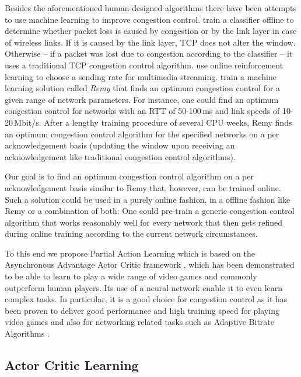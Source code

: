 \documentclass[newfonts=false,format=sigconf,10pt,letterpaper]{acmart}
\begin{document}
Besides the aforementioned human-designed algorithms there have been attempts to use machine learning to improve congestion control. \citet{geurts_machine_2004} train a classifier offline to determine whether packet loss is caused by congestion or by the link layer in case of wireless links. If it is caused by the link layer, TCP does not alter the window. Otherwise -- if a packet was lost due to congestion according to the classifier -- it uses a traditional TCP congestion control algorithm. \citet{shaio_reinforcement_2005} use online reinforcement learning to choose a sending rate for multimedia streaming. \citet{winstein_tcp_2013} train a machine learning solution called \textit{Remy} that finds an optimum congestion control for a given range of network parameters. For instance, one could find an optimum congestion control for networks with an RTT of 50-100\,ms and link speeds of 10-20\,Mbit/s. After a lengthy training procedure of several CPU weeks, Remy finds an optimum congestion control algorithm for the specified networks on a per acknowledgement basis (updating the window upon receiving an acknowledgement like traditional congestion control algorithms). 

Our goal is to find an optimum congestion control algorithm on a per acknowledgement basis similar to Remy that, however, can be trained online.  Such a solution could be used in a purely online fashion, in a offline fashion like Remy or a combination of both: One could pre-train a generic congestion control algorithm that works reasonably well for every network that then gets refined during online training according to the current network circumstances. 

To this end we propose Partial Action Learning which is based on the Asynchronous Advantage Actor Critic framework \cite{mnih_asynchronous_2016}, which has been demonstrated to be able to learn to play a wide range of video games and commonly outperform human players. Its use of a neural network enable it to even learn complex tasks. In particular, it is a good choice for congestion control as it has been proven to deliver good performance and high training speed for playing video games and also for networking related tasks such as Adaptive Bitrate Algorithms \cite{mao_neural_2017}. 

\subsection{Actor Critic Learning}
\label{subsec:ac}
\end{document}
